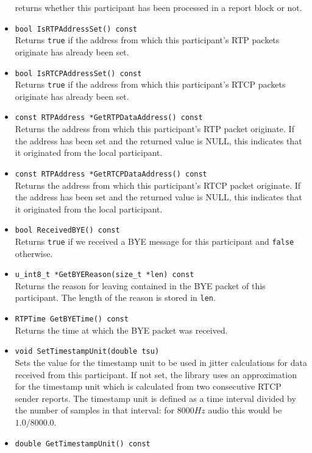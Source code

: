 \documentclass[12pt,a4paper]{article}
\begin{document}
\begin{itemize}
						returns whether this participant has been processed in a report
						block or not.
					\item {\tt bool IsRTPAddressSet() const}\\
						Returns {\tt true} if the address from which this participant's RTP packets
						originate has already been set.
					\item {\tt bool IsRTCPAddressSet() const}\\
						Returns {\tt true} if the address from which this participant's RTCP packets
						originate has already been set.
					\item {\tt const RTPAddress *GetRTPDataAddress() const}\\
						Returns the address from which this participant's RTP packet originate. If the
						address has been set and the returned value is NULL, this indicates that it
						originated from the local participant.
					\item {\tt const RTPAddress *GetRTCPDataAddress() const}\\
						Returns the address from which this participant's RTCP packet originate. If the
						address has been set and the returned value is NULL, this indicates that it
						originated from the local participant.					
					\item {\tt bool ReceivedBYE() const}\\
						Returns {\tt true} if we received a BYE message for this participant and
						{\tt false} otherwise.
					\item {\tt u\_int8\_t *GetBYEReason(size\_t *len) const}\\
						Returns the reason for leaving contained in the BYE packet of this participant.
						The length of the reason is stored in {\tt len}.
					\item {\tt RTPTime GetBYETime() const}\\
						Returns the time at which the BYE packet was received.
					\item {\tt void SetTimestampUnit(double tsu)}\\
						Sets the value for the timestamp unit to be used in jitter calculations
						for data received from this participant. If not set, the library uses an
						approximation for the timestamp unit which is calculated from two consecutive
						RTCP sender reports. The timestamp unit is defined as a time interval divided
						by the number of samples in that interval: for $8000 Hz$ audio this would be
						$1.0/8000.0$.
					\item {\tt double GetTimestampUnit() const}\\

\end{itemize}
\end{document}
